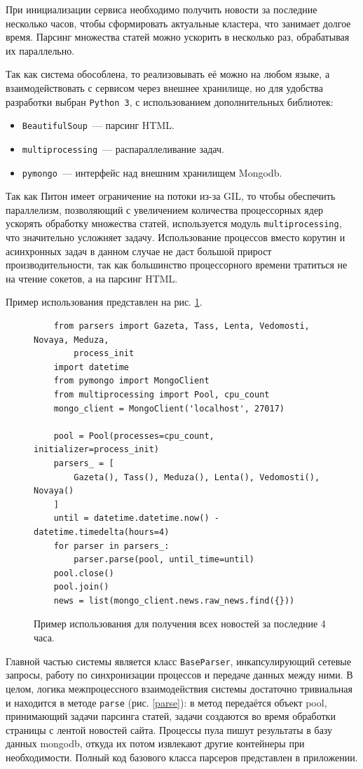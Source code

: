 \documentclass[a4paper, 14pt]{extarticle}
\begin{document}
При инициализации сервиса необходимо получить новости за последние несколько часов, чтобы сформировать актуальные кластера, что занимает долгое время. Парсинг множества статей можно ускорить в несколько раз, обрабатывая их параллельно.

Так как система обособлена, то реализовывать её можно на любом языке, а взаимодействовать с сервисом через внешнее хранилище, но для удобства разработки выбран \texttt{Python 3}, с использованием дополнительных библиотек: 
\begin{itemize}
	\item \texttt{BeautifulSoup}~--- парсинг HTML.
	\item \texttt{multiprocessing}~--- распараллеливание задач.
	\item \texttt{pymongo}~--- интерфейс над внешним хранилищем Mongodb.
\end{itemize}

Так как Питон имеет ограничение на потоки из-за GIL, то чтобы обеспечить параллелизм, позволяющий с увеличением количества процессорных ядер ускорять обработку множества статей, используется модуль \texttt{multiprocessing}, что значительно усложняет задачу. Использование процессов вместо корутин и асинхронных задач в данном случае не даст большой прирост производительности, так как большинство процессорного времени тратиться не на чтение сокетов, а на парсинг HTML. 

Пример использования представлен на рис. \ref{example}. 

\begin{figure}
	\centering
	\begin{verbatim}
	from parsers import Gazeta, Tass, Lenta, Vedomosti, Novaya, Meduza,
	    process_init
	import datetime
	from pymongo import MongoClient
	from multiprocessing import Pool, cpu_count
	mongo_client = MongoClient('localhost', 27017)
	
	pool = Pool(processes=cpu_count, initializer=process_init)
	parsers_ = [
	    Gazeta(), Tass(), Meduza(), Lenta(), Vedomosti(), Novaya()
	]
	until = datetime.datetime.now() - datetime.timedelta(hours=4)
	for parser in parsers_:
	    parser.parse(pool, until_time=until)
	pool.close()
	pool.join()
	news = list(mongo_client.news.raw_news.find({}))
	\end{verbatim}
	\caption{Пример использования для получения всех новостей за последние 4 часа.}
	\label{example}
\end{figure}

Главной частью системы является класс \texttt{BaseParser}, инкапсулирующий сетевые запросы, работу по синхронизации процессов и передаче данных между ними. В целом, логика межпроцессного взаимодействия системы достаточно тривиальная и находится в методе \texttt{parse} (рис. \ref{parse}): в метод передаётся объект pool, принимающий задачи парсинга статей, задачи создаются во время обработки страницы с лентой новостей сайта. Процессы пула пишут результаты в базу данных mongodb, откуда их потом извлекают другие контейнеры при необходимости.  Полный код базового класса парсеров представлен в приложении.
\end{document}
